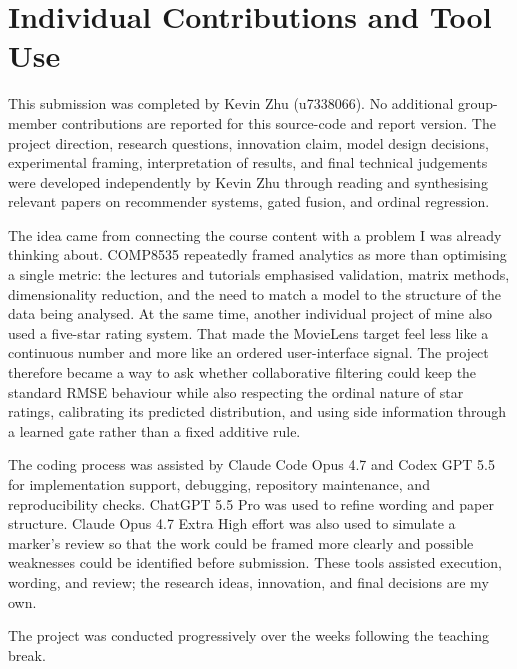 \documentclass[a4paper]{article} %
\begin{document}
\clearpage
\section*{Individual Contributions and Tool Use}
This submission was completed by Kevin Zhu (u7338066). No additional
group-member contributions are reported for this source-code and report version.
The project direction, research questions, innovation claim, model design
decisions, experimental framing, interpretation of results, and final technical
judgements were developed independently by Kevin Zhu through reading and
synthesising relevant papers on recommender systems, gated fusion, and ordinal
regression.

The idea came from connecting the course content with a problem I was already
thinking about. COMP8535 repeatedly framed analytics as more than optimising a
single metric: the lectures and tutorials emphasised validation, matrix methods,
dimensionality reduction, and the need to match a model to the structure of the
data being analysed. At the same time, another individual project of mine also
used a five-star rating system. That made the MovieLens target feel less like a
continuous number and more like an ordered user-interface signal. The project
therefore became a way to ask whether collaborative filtering could keep the
standard RMSE behaviour while also respecting the ordinal nature of star ratings,
calibrating its predicted distribution, and using side information through a
learned gate rather than a fixed additive rule.

The coding process was assisted by Claude Code Opus 4.7 and Codex GPT 5.5 for
implementation support, debugging, repository maintenance, and reproducibility
checks. ChatGPT 5.5 Pro was used to refine wording and paper structure. Claude
Opus 4.7 Extra High effort was also used to simulate a marker's review so that
the work could be framed more clearly and possible weaknesses could be
identified before submission. These tools assisted execution, wording, and
review; the research ideas, innovation, and final decisions are my own.

The project was conducted progressively over the weeks following the teaching
break.
\end{document}
